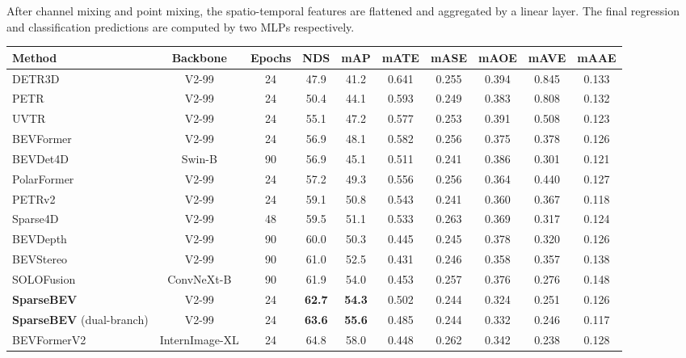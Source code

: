\documentclass[10pt,twocolumn,letterpaper]{article}
\begin{document}
After channel mixing and point mixing, the spatio-temporal features are flattened and aggregated by a linear layer. The final regression and classification predictions are computed by two MLPs respectively.

\setlength{\tabcolsep}{4pt}
\begin{table*}[t]
  \centering
  \begin{tabular}{l|c|c|cc|ccccc}
    \toprule
    Method & Backbone & Epochs & NDS & mAP & mATE & mASE & mAOE & mAVE & mAAE \\ 
    \midrule
    DETR3D \cite{detr3d}           & V2-99 & 24 & 47.9 & 41.2 & 0.641 & 0.255 & 0.394 & 0.845 & 0.133 \\
    PETR \cite{petr}               & V2-99 & 24 & 50.4 & 44.1 & 0.593 & 0.249 & 0.383 & 0.808 & 0.132 \\
    UVTR \cite{uvtr}               & V2-99 & 24 & 55.1 & 47.2 & 0.577 & 0.253 & 0.391 & 0.508 & 0.123 \\
    BEVFormer \cite{bevformer}     & V2-99 & 24 & 56.9 & 48.1 & 0.582 & 0.256 & 0.375 & 0.378 & 0.126 \\
    BEVDet4D \cite{bevdet4d}       & Swin-B \cite{swin} & 90 & 56.9 & 45.1 & 0.511 & 0.241 & 0.386 & 0.301 & 0.121 \\
    PolarFormer \cite{polarformer} & V2-99 & 24 & 57.2 & 49.3 & 0.556 & 0.256 & 0.364 & 0.440 & 0.127 \\
    PETRv2 \cite{petrv2}           & V2-99 & 24 & 59.1 & 50.8 & 0.543 & 0.241 & 0.360 & 0.367 & 0.118 \\
    Sparse4D \cite{sparse4d}       & V2-99 & 48 & 59.5 & 51.1 & 0.533 & 0.263 & 0.369 & 0.317 & 0.124 \\
    BEVDepth \cite{bevdepth}       & V2-99 & 90 & 60.0 & 50.3 & 0.445 & 0.245 & 0.378 & 0.320 & 0.126 \\
    BEVStereo \cite{bevstereo}     & V2-99 & 90 & 61.0 & 52.5 & 0.431 & 0.246 & 0.358 & 0.357 & 0.138 \\
    SOLOFusion \cite{solofusion}   & ConvNeXt-B \cite{convnext} & 90 & 61.9 & 54.0 & 0.453 & 0.257 & 0.376 & 0.276 & 0.148 \\
    \rowcolor{Gray}
    \textbf{SparseBEV}             & V2-99 & 24 & \textbf{62.7} & \textbf{54.3} & 0.502 & 0.244 & 0.324 & 0.251 & 0.126 \\
    \rowcolor{Gray}
    \textbf{SparseBEV} (dual-branch) & V2-99 & 24 & \textbf{63.6} & \textbf{55.6} & 0.485 & 0.244 & 0.332 & 0.246 & 0.117 \\
    \midrule
    BEVFormerV2  \cite{bevformerv2} & InternImage-XL \cite{internimage} & 24 & 64.8 & 58.0 & 0.448 & 0.262 & 0.342 & 0.238 & 0.128 \\

\end{tabular}
\end{table*}
\end{document}
